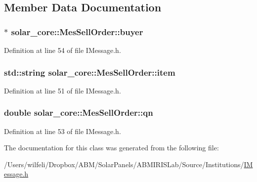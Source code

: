 \subsection{Member Data Documentation}
\hypertarget{classsolar__core_1_1_mes_sell_order_a02e3045834f188382cad87aecd7bfbab}{}
\subsubsection[{buyer}]{$\ast$ solar\+\_\+core\+::\+Mes\+Sell\+Order\+::buyer}\label{classsolar__core_1_1_mes_sell_order_a02e3045834f188382cad87aecd7bfbab}


Definition at line 54 of file I\+Message.\+h.

\hypertarget{classsolar__core_1_1_mes_sell_order_a4ef673afdc40170ef0e99d459bdf8d62}{}
\subsubsection[{item}]{\setlength{\rightskip}{0pt plus 5cm}std\+::string solar\+\_\+core\+::\+Mes\+Sell\+Order\+::item}\label{classsolar__core_1_1_mes_sell_order_a4ef673afdc40170ef0e99d459bdf8d62}


Definition at line 51 of file I\+Message.\+h.

\hypertarget{classsolar__core_1_1_mes_sell_order_a14d9034fdc15d82ce04bd132d3d838f0}{}
\subsubsection[{qn}]{\setlength{\rightskip}{0pt plus 5cm}double solar\+\_\+core\+::\+Mes\+Sell\+Order\+::qn}\label{classsolar__core_1_1_mes_sell_order_a14d9034fdc15d82ce04bd132d3d838f0}


Definition at line 53 of file I\+Message.\+h.



The documentation for this class was generated from the following file\+:\begin{DoxyCompactItemize}
\item 
/\+Users/wilfeli/\+Dropbox/\+A\+B\+M/\+Solar\+Panels/\+A\+B\+M\+I\+R\+I\+S\+Lab/\+Source/\+Institutions/\hyperlink{_i_message_8h}{I\+Message.\+h}\end{DoxyCompactItemize}
